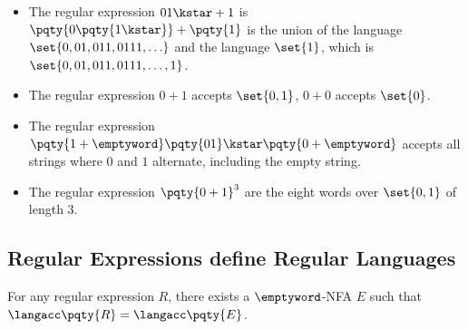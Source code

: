 \begin{examples*}
    \begin{itemize}
        \item The regular expression \(0 1\kstar + 1\) is \(\pqty{0 \pqty{1\kstar}} + \pqty{1}\) is the union of the language \(\set{0, 01, 011, 0111, \ldots}\) and the language \(\set{1}\), which is \(\set{0, 01, 011, 0111, \ldots, 1}\).
        \item The regular expression \(0 + 1\) accepts \(\set{0, 1}\), \(0 + 0\) accepts \(\set{0}\).
        \item The regular expression \(\pqty{1 + \emptyword}\pqty{01}\kstar \pqty{0 + \emptyword}\) accepts all strings where \(0\) and \(1\) alternate, including the empty string.
        \item The regular expression \(\pqty{0 + 1}^3\) are the eight words over \(\set{0, 1}\) of length \(3\).
    \end{itemize}
\end{examples*}

\subsection{Regular Expressions define Regular Languages}

\begin{theorem}
    For any regular expression \(R\), there exists a \(\emptyword\)-NFA \(E\) such that \(\langacc\pqty{R} = \langacc\pqty{E}\).
\end{theorem}


